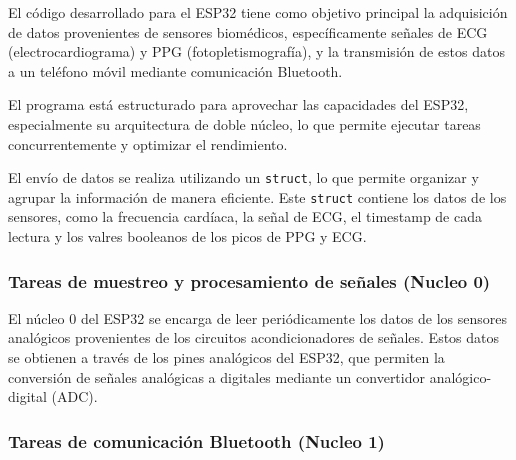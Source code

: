     El código desarrollado para el ESP32 tiene como objetivo principal la adquisición de datos provenientes de sensores biomédicos, específicamente señales de ECG (electrocardiograma) y PPG (fotopletismografía), y la transmisión de estos datos a un teléfono móvil mediante comunicación Bluetooth.

    El programa está estructurado para aprovechar las capacidades del ESP32, especialmente su arquitectura de doble núcleo, lo que permite ejecutar tareas concurrentemente y optimizar el rendimiento.

    
    
    El envío de datos se realiza utilizando un \texttt{struct}, lo que permite organizar y agrupar la información de manera eficiente. Este \texttt{struct} contiene los datos de los sensores, como la frecuencia cardíaca, la señal de ECG, el timestamp de cada lectura y los valres booleanos de los picos de PPG y ECG.

    

        \subsubsection{Tareas de muestreo y procesamiento de señales (Nucleo 0)}

        El núcleo 0 del ESP32 se encarga de leer periódicamente los datos de los sensores analógicos provenientes de los circuitos acondicionadores de señales. Estos datos se obtienen a través de los pines analógicos del ESP32, que permiten la conversión de señales analógicas a digitales mediante un convertidor analógico-digital (ADC).

        

        \subsubsection{Tareas de comunicación Bluetooth (Nucleo 1)}

